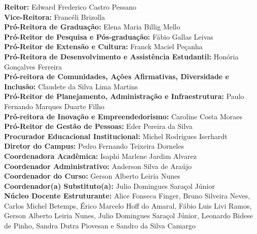 \noindent \textbf{Reitor:} Edward Frederico Castro Pessano\\
\textbf{Vice-Reitora:} Francéli Brizolla\\
\textbf{Pró-Reitora de Graduação:} Elena Maria Billig Mello\\
\textbf{Pró-Reitor de Pesquisa e Pós-graduação:} Fábio Gallas Leivas\\
\textbf{Pró-Reitor de Extensão e Cultura:} Franck Maciel Peçanha\\
\textbf{Pró-Reitora de Desenvolvimento e Assistência Estudantil:} Honória Gonçalves Ferreira\\
\textbf{Pró-reitora de Comunidades, Ações Afirmativas, Diversidade e Inclusão:} Claudete da Silva Lima Martins\\
\textbf{Pró-Reitor de Planejamento, Administração e Infraestrutura:} Paulo Fernando Marques Duarte Filho\\
\textbf{Pró-reitora de Inovação e Empreendedorismo:} Caroline Costa Moraes\\
\textbf{Pró-Reitor de Gestão de Pessoas:} Eder Pereira da Silva\\
\textbf{Procurador Educacional Institucional:} Michel Rodrigues Iserhardt\\

\vspace{0.5cm}
\noindent \textbf{Diretor do Campus:} Pedro Fernando Teixeira Dorneles\\
\textbf{Coordenadora Acadêmica:} Isaphi Marlene Jardim Alvarez\\
\textbf{Coordenador Administrativo:} Anderson Silva de Araújo\\
\textbf{Coordenador do Curso:} Gerson Alberto Leiria Nunes\\
\textbf{Coordenador(a) Substituto(a):} Julio Domingues Saraçol Júnior\\
\textbf{Núcleo Docente Estruturante:} Alice Fonseca Finger, Bruno Silveira Neves, Carlos Michel Betemps, Érico Marcelo Hoff do Amaral, Fábio Luis Livi Ramos, Gerson Alberto Leiria Nunes, Julio Domingues Saraçol Júnior, Leonardo Bidese de Pinho, Sandra Dutra Piovesan e Sandro da Silva Camargo

\newpage
